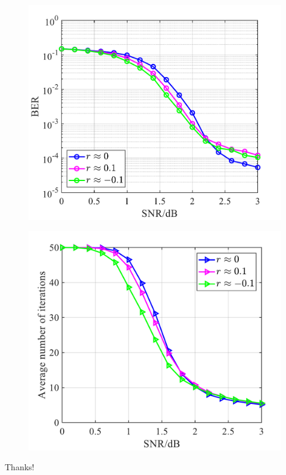 \documentclass[UTF8]{beamer}
\begin{document}
\begin{frame}
  \begin{minipage}[c]{0.48\linewidth}
    \begin{figure}
      \centering
      \includegraphics[width=0.95\linewidth]{./fig/BER_DegCorr.pdf}
    \end{figure}
  \end{minipage}
  \hfill
  \begin{minipage}[c]{0.48\linewidth}
    \begin{figure}
      \centering
      \includegraphics[width=0.95\linewidth]{./fig/ITER_DegCorr.pdf}
    \end{figure}
  \end{minipage}
\end{frame}

\begin{frame}
  \begin{center}
    {\Huge\calligra Thanks!}
  \end{center}
\end{frame}
\end{document}
